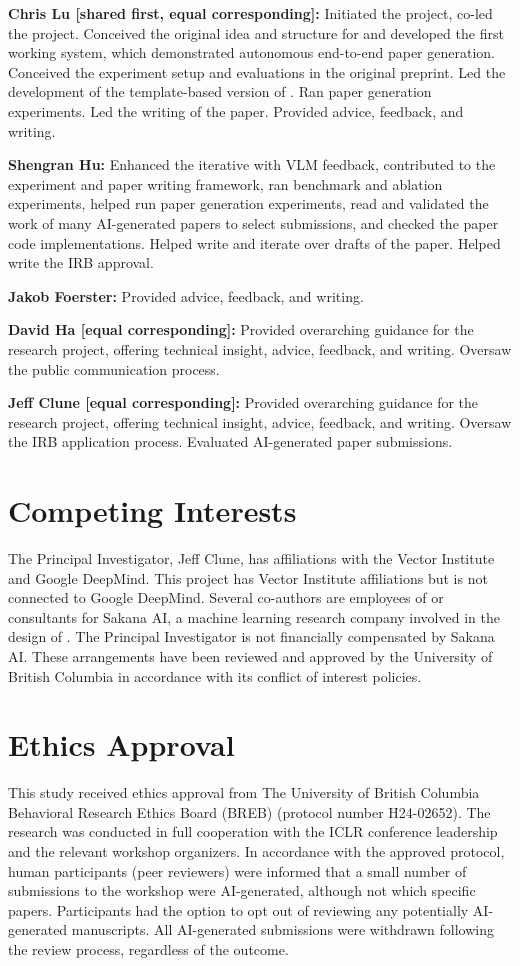 \textbf{Chris Lu [shared first, equal corresponding]:} Initiated the project, co-led the project. Conceived the original idea and structure for \ouralgo and developed the first working system, which demonstrated autonomous end-to-end paper generation. Conceived the experiment setup and evaluations in the original preprint. Led the development of the template-based version of \ouralgo. Ran paper generation experiments. Led the writing of the paper. Provided advice, feedback, and writing.

\textbf{Shengran Hu:} Enhanced the iterative \ourreviewer with VLM feedback, contributed to the experiment and paper writing framework, ran \ourreviewer benchmark and ablation experiments, helped run paper generation experiments, read and validated the work of many AI-generated papers to select submissions, and checked the paper code implementations. Helped write and iterate over drafts of the paper. Helped write the IRB approval.

\textbf{Jakob Foerster:} Provided advice, feedback, and writing.

\textbf{David Ha [equal corresponding]:} Provided overarching guidance for the research project, offering technical insight, advice, feedback, and writing. Oversaw the public communication process.

\textbf{Jeff Clune [equal corresponding]:} Provided overarching guidance for the research project, offering technical insight, advice, feedback, and writing. Oversaw the IRB application process. Evaluated AI-generated paper submissions.

\section*{Competing Interests}
The Principal Investigator, Jeff Clune, has affiliations with the Vector Institute and Google DeepMind.
This project has Vector Institute affiliations but is not connected to Google DeepMind.
Several co-authors are employees of or consultants for Sakana AI, a machine learning research company involved in the design of \ouralgo.
The Principal Investigator is not financially compensated by Sakana AI.
These arrangements have been reviewed and approved by the University of British Columbia in accordance with its conflict of interest policies.

\section*{Ethics Approval}
This study received ethics approval from The University of British Columbia Behavioral Research Ethics Board (BREB) (protocol number H24-02652).
The research was conducted in full cooperation with the ICLR conference leadership and the relevant workshop organizers.
In accordance with the approved protocol, human participants (peer reviewers) were informed that a small number of submissions to the workshop were AI-generated, although not which specific papers.
Participants had the option to opt out of reviewing any potentially AI-generated manuscripts.
All AI-generated submissions were withdrawn following the review process, regardless of the outcome.

